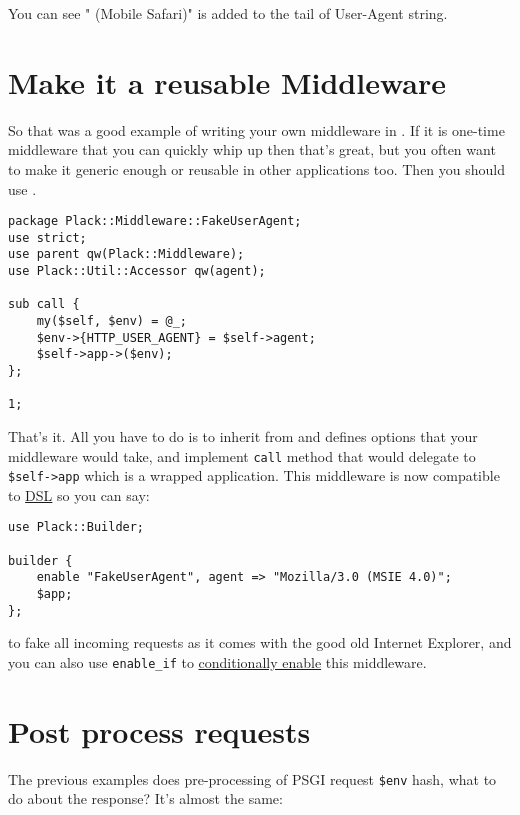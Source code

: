 You can see " (Mobile Safari)" is added to the tail of User-Agent
string.

\section{Make it a reusable
Middleware}\label{make-it-a-reusable-middleware}

So that was a good example of writing your own middleware in
. If it is one-time middleware that you can quickly
whip up then that's great, but you often want to make it generic enough
or reusable in other applications too. Then you should use
.

\begin{lstlisting}
package Plack::Middleware::FakeUserAgent;
use strict;
use parent qw(Plack::Middleware);
use Plack::Util::Accessor qw(agent);

sub call {
    my($self, $env) = @_;
    $env->{HTTP_USER_AGENT} = $self->agent;
    $self->app->($env);
};

1;
\end{lstlisting}

That's it. All you have to do is to inherit from  and
defines options that your middleware would take, and implement
\lstinline!call! method that would delegate to \lstinline!$self->app!
which is a wrapped application. This middleware is now compatible to
\href{http://advent.plackperl.org/2009/12/day-11-using-plackbuilder.html}{
DSL} so you can say:

\begin{lstlisting}
use Plack::Builder;

builder {
    enable "FakeUserAgent", agent => "Mozilla/3.0 (MSIE 4.0)";
    $app;
};
\end{lstlisting}
%
to fake all incoming requests as it comes with the good old Internet
Explorer, and you can also use \lstinline!enable_if! to
\href{http://advent.plackperl.org/2009/12/day-18-load-middleware-conditionally.html}{conditionally
enable} this middleware.

\section{Post process requests}\label{post-process-requests}

The previous examples does pre-processing of PSGI request
\lstinline!$env! hash, what to do about the response? It's almost the
same:

